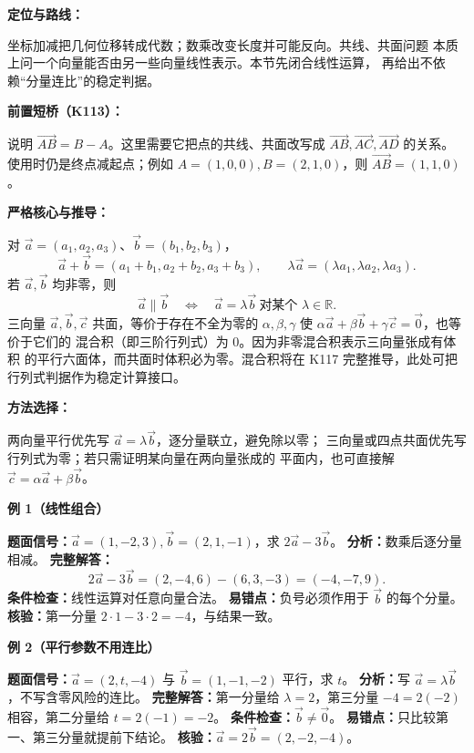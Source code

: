 

\begin{knowledgeBox}
\textbf{定位与路线：}

坐标加减把几何位移转成代数；数乘改变长度并可能反向。共线、共面问题
本质上问一个向量能否由另一些向量线性表示。本节先闭合线性运算，
再给出不依赖“分量连比”的稳定判据。

\textbf{前置短桥（K113）：}

说明
\(\overrightarrow{AB}=B-A\)。这里需要它把点的共线、共面改写成
\(\overrightarrow{AB},\overrightarrow{AC},\overrightarrow{AD}\) 的关系。
使用时仍是终点减起点；例如 \(A=(1,0,0),B=(2,1,0)\)，则
\(\overrightarrow{AB}=(1,1,0)\)。

\textbf{严格核心与推导：}

对 \(\vec a=(a_1,a_2,a_3)\)、\(\vec b=(b_1,b_2,b_3)\)，
\[
\vec a+\vec b=(a_1+b_1,a_2+b_2,a_3+b_3),\qquad
\lambda\vec a=(\lambda a_1,\lambda a_2,\lambda a_3).
\]
若 \(\vec a,\vec b\) 均非零，则
\[
\vec a\parallel\vec b
\quad\Longleftrightarrow\quad
\vec a=\lambda\vec b\ \text{对某个 }\lambda\in\mathbb R.
\]
三向量 \(\vec a,\vec b,\vec c\) 共面，等价于存在不全为零的
\(\alpha,\beta,\gamma\) 使
\(\alpha\vec a+\beta\vec b+\gamma\vec c=\vec0\)，也等价于它们的
混合积（即三阶行列式）为 \(0\)。因为非零混合积表示三向量张成有体积
的平行六面体，而共面时体积必为零。混合积将在 K117 完整推导，此处可把
行列式判据作为稳定计算接口。

\textbf{方法选择：}

两向量平行优先写 \(\vec a=\lambda\vec b\)，逐分量联立，避免除以零；
三向量或四点共面优先写行列式为零；若只需证明某向量在两向量张成的
平面内，也可直接解 \(\vec c=\alpha\vec a+\beta\vec b\)。

\textbf{例 1（线性组合）}

\textbf{题面信号：}\(\vec a=(1,-2,3),\vec b=(2,1,-1)\)，求
\(2\vec a-3\vec b\)。
\textbf{分析：}数乘后逐分量相减。
\textbf{完整解答：}
\[
2\vec a-3\vec b=(2,-4,6)-(6,3,-3)=(-4,-7,9).
\]
\textbf{条件检查：}线性运算对任意向量合法。
\textbf{易错点：}负号必须作用于 \(\vec b\) 的每个分量。
\textbf{核验：}第一分量 \(2\cdot1-3\cdot2=-4\)，与结果一致。

\textbf{例 2（平行参数不用连比）}

\textbf{题面信号：}\(\vec a=(2,t,-4)\) 与 \(\vec b=(1,-1,-2)\)
平行，求 \(t\)。
\textbf{分析：}写 \(\vec a=\lambda\vec b\)，不写含零风险的连比。
\textbf{完整解答：}第一分量给 \(\lambda=2\)，第三分量
\(-4=2(-2)\) 相容，第二分量给 \(t=2(-1)=-2\)。
\textbf{条件检查：}\(\vec b\ne\vec0\)。
\textbf{易错点：}只比较第一、第三分量就提前下结论。
\textbf{核验：}\(\vec a=2\vec b=(2,-2,-4)\)。


\end{knowledgeBox}
